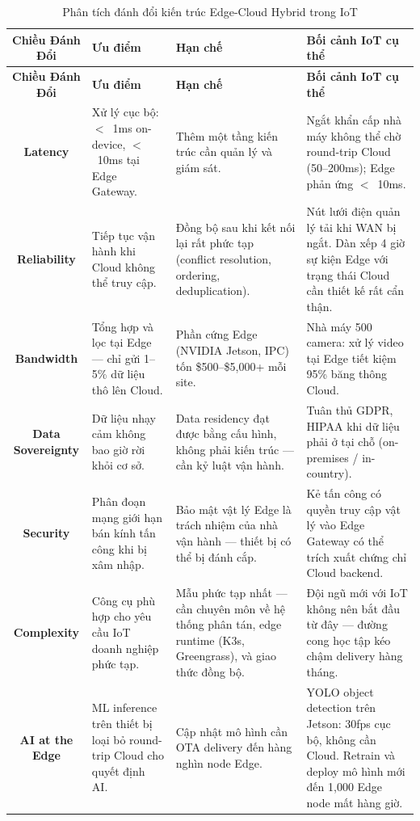 \begin{longtable}{c p{4cm} p{4cm} p{4cm}}

\caption{Phân tích đánh đổi kiến trúc Edge-Cloud Hybrid trong IoT} \\

\toprule
\textbf{Chiều Đánh Đổi} & \textbf{Ưu điểm} & \textbf{Hạn chế} & \textbf{Bối cảnh IoT cụ thể} \\
\midrule
\endfirsthead

\toprule
\textbf{Chiều Đánh Đổi} & \textbf{Ưu điểm} & \textbf{Hạn chế} & \textbf{Bối cảnh IoT cụ thể} \\
\midrule
\endhead

\bottomrule
\endlastfoot


\textbf{Latency}
  & Xử lý cục bộ: $<$~1ms on-device, $<$~10ms tại Edge Gateway.
  & Thêm một tầng kiến trúc cần quản lý và giám sát.
  & Ngắt khẩn cấp nhà máy không thể chờ round-trip Cloud (50--200ms); Edge phản ứng $<$~10ms. \\
\hline

\textbf{Reliability}
  & Tiếp tục vận hành khi Cloud không thể truy cập.
  & Đồng bộ sau khi kết nối lại rất phức tạp (conflict resolution, ordering, deduplication).
  & Nút lưới điện quản lý tải khi WAN bị ngắt. Dàn xếp 4 giờ sự kiện Edge với trạng thái Cloud cần thiết kế rất cẩn thận. \\
\hline

\textbf{Bandwidth}
  & Tổng hợp và lọc tại Edge --- chỉ gửi 1--5\% dữ liệu thô lên Cloud.
  & Phần cứng Edge (NVIDIA Jetson, IPC) tốn \$500--\$5,000+ mỗi site.
  & Nhà máy 500 camera: xử lý video tại Edge tiết kiệm 95\% băng thông Cloud. \\
\hline

\textbf{Data Sovereignty}
  & Dữ liệu nhạy cảm không bao giờ rời khỏi cơ sở.
  & Data residency đạt được bằng cấu hình, không phải kiến trúc --- cần kỷ luật vận hành.
  & Tuân thủ GDPR, HIPAA khi dữ liệu phải ở tại chỗ (on-premises / in-country). \\
\hline

\textbf{Security}
  & Phân đoạn mạng giới hạn bán kính tấn công khi bị xâm nhập.
  & Bảo mật vật lý Edge là trách nhiệm của nhà vận hành --- thiết bị có thể bị đánh cắp.
  & Kẻ tấn công có quyền truy cập vật lý vào Edge Gateway có thể trích xuất chứng chỉ Cloud backend. \\
\hline

\textbf{Complexity}
  & Công cụ phù hợp cho yêu cầu IoT doanh nghiệp phức tạp.
  & Mẫu phức tạp nhất --- cần chuyên môn về hệ thống phân tán, edge runtime (K3s, Greengrass), và giao thức đồng bộ.
  & Đội ngũ mới với IoT không nên bắt đầu từ đây --- đường cong học tập kéo chậm delivery hàng tháng. \\
\hline

\textbf{AI at the Edge}
  & ML inference trên thiết bị loại bỏ round-trip Cloud cho quyết định AI.
  & Cập nhật mô hình cần OTA delivery đến hàng nghìn node Edge.
  & YOLO object detection trên Jetson: 30fps cục bộ, không cần Cloud. Retrain và deploy mô hình mới đến 1,000 Edge node mất hàng giờ. \\

\end{longtable}

